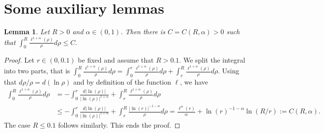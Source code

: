 \documentclass[11 pt]{article}
\newtheorem{lemma}[theorem]{Lemma}
\numberwithin{equation}{section}
\begin{document}
\section{Some auxiliary lemmas}
%
\begin{lemma}\label{lem:over}
Let $R>0$ and $\alpha\in(0,1)$. Then there is $C=C(R,\alpha)>0$ such that $\int_0^{R} \frac{\ell^{1+\alpha}(\rho)}{\rho}d\rho\leq C.$
\end{lemma}
%
\begin{proof}
Let $r\in(0,0.1)$ be fixed and assume that $R>0.1$. We split the integral into two parts, that is $\int_{0}^{R}\frac{\ell^{1+\alpha}(\rho)}{\rho}d\rho=\int_{0}^{r} \frac{\ell^{1+\alpha}(\rho)}{\rho}d\rho + \int_{r}^{R}\frac{\ell^{1+\alpha}(\rho)}{\rho}d\rho.$ Using that $d\rho/\rho=d(\ln \rho)$ and by definition of the function $\ell$, we have
%
\begin{align*}
    \int_{0}^{R}\frac{\ell^{1+\alpha}(\rho)}{\rho}d\rho &=-\int_{0}^{r} \frac{d|\ln(\rho)|}{|\ln(\rho)|^{1+\alpha}} + \int_{r}^{R}\frac{\ell^{1+\alpha}(\rho)}{\rho}d\rho 
    \\ &\leq -\int_{0}^{r} \frac{d|\ln(\rho)|}{|\ln(\rho)|^{1+\alpha}} + \int_{r}^{R}\frac{|\ln(r)|^{-1-\alpha}}{\rho}d\rho=\frac{\ell^\alpha(r)}{\alpha}+\ln(r)^{-1-\alpha}\ln(R/r):=C(R,\alpha).
\end{align*}
%
The case $R\leq 0.1$ follows similarly. This ends the proof. 
\end{proof}
%
%
\end{document}
